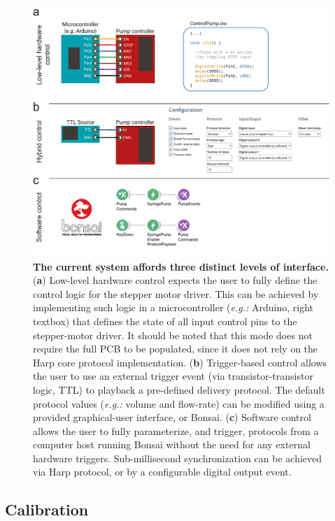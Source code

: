 \begin{itemize}
\begin{figure}
	\centering
	\includegraphics[width=1.0\linewidth]{Figures/Artboard 4.pdf}
	\caption{\textbf{The current system affords three distinct levels of interface.}\\
		(\textbf{a}) Low-level hardware control expects the user to fully define the control logic for the stepper motor driver. This can be achieved by implementing such logic in a microcontroller (\textit{e.g.:} Arduino, right textbox) that defines the state of all input control pins to the stepper-motor driver. It should be noted that this mode does not require the full PCB to be populated, since it does not rely on the Harp core protocol implementation. (\textbf{b}) Trigger-based control allows the user to use an external trigger event (via transistor-transistor logic, TTL) to playback a pre-defined delivery protocol. The default protocol values (\textit{e.g.:} volume and flow-rate) can be modified using a provided graphical-user interface, or Bonsai. (\textbf{c}) Software control allows the user to fully parameterize, and trigger, protocols from a computer host running Bonsai without the need for any external hardware triggers. Sub-millisecond synchronization can be achieved via Harp protocol, or by a configurable digital output event.}
	\label{fig:PumpControl} 
\end{figure}

\end{itemize}

\subsection*{Calibration}
